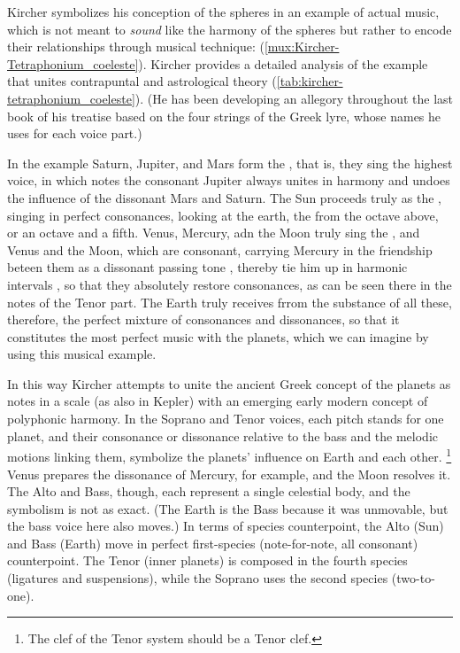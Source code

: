 Kircher symbolizes his conception of the spheres in an example of actual music,
which is not meant to \emph{sound} like the harmony of the spheres but rather to
encode their relationships through musical technique:
 (\cref{mux:Kircher-Tetraphonium_coeleste}).%
\citXXX[Ibid 384]
Kircher provides a detailed analysis of the example that unites contrapuntal and
astrological theory (\cref{tab:kircher-tetraphonium_coeleste}).
(He has been developing an allegory throughout the last book of
his treatise based on the four strings of the Greek lyre, whose
names he uses for each voice part.)
\begin{quoting}
	In the example Saturn, Jupiter, and Mars form the , that
	is, they sing the highest voice, in which notes the consonant Jupiter
	always unites in harmony  and undoes the influence of
	 the dissonant Mars and Saturn.
	The Sun proceeds truly as the  , singing in
	perfect consonances, looking at the earth, the 
	 from the octave above, or an octave and a fifth.
	Venus, Mercury, adn the Moon truly sing the 
	, and Venus and the Moon, which are consonant, carrying
	Mercury in the friendship beteen them as a dissonant passing tone
	, thereby tie him up in harmonic
	intervals , so that they absolutely restore
	consonances, as can be seen there in the notes of the Tenor part.
	The Earth truly receives frrom the substance of all these, therefore,
	the perfect mixture of consonances and dissonances, so that it
        constitutes the most perfect music with the planets, which we can
        imagine by using this musical example.%
	\citXXX[Kircher II:383-384]
\end{quoting}
In this way Kircher attempts to unite the ancient Greek concept of the planets
as notes in a scale (as also in Kepler) with an emerging early modern concept of
polyphonic harmony.
In the Soprano and Tenor voices, each pitch stands for one planet, and their
consonance or dissonance relative to the bass and the melodic motions linking
them, symbolize the planets' influence on Earth and each other.%
	\footnote{The clef of the Tenor system should be a Tenor clef.}
Venus prepares the dissonance of Mercury, for example, and the Moon resolves it.
The Alto and Bass, though, each represent a single celestial body, and the
symbolism is not as exact.
(The Earth is the Bass because it was unmovable, but the bass voice here also
moves.)
In terms of species counterpoint, the Alto (Sun) and Bass (Earth) move in
perfect first-species (note-for-note, all consonant) counterpoint.%
The Tenor (inner planets) is composed in the fourth species (ligatures and
suspensions), while the Soprano uses the second species (two-to-one).

